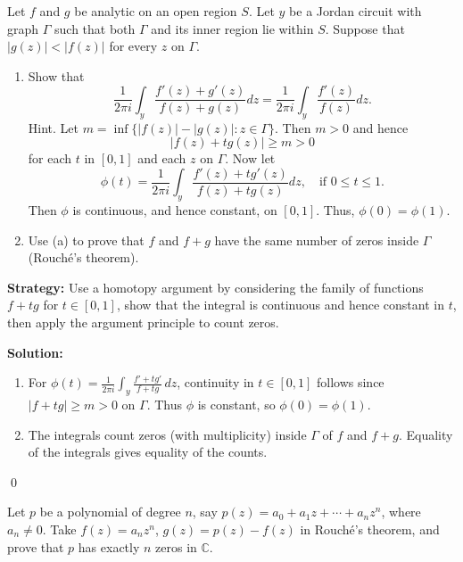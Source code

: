 \begin{problembox}
Let \( f \) and \( g \) be analytic on an open region \( S \). Let \( y \) be a Jordan circuit with graph \( \Gamma \) such that both \( \Gamma \) and its inner region lie within \( S \). Suppose that \( |g(z)| < |f(z)| \) for every \( z \) on \( \Gamma \).
\begin{enumerate}[label=(\alph*)]
\item Show that
\[ \frac{1}{2\pi i} \int_{y} \frac{f'(z) + g'(z)}{f(z) + g(z)} dz = \frac{1}{2\pi i} \int_{y} \frac{f'(z)}{f(z)} dz. \]
Hint. Let \( m = \inf \{ |f(z)| - |g(z)| : z \in \Gamma \} \). Then \( m > 0 \) and hence
\[ |f(z) + t g(z)| \geq m > 0 \]
for each \( t \) in \( [0, 1] \) and each \( z \) on \( \Gamma \). Now let
\[ \phi(t) = \frac{1}{2\pi i} \int_{y} \frac{f'(z) + t g'(z)}{f(z) + t g(z)} dz, \quad \text{if } 0 \leq t \leq 1. \]
Then \( \phi \) is continuous, and hence constant, on \( [0, 1] \). Thus, \( \phi(0) = \phi(1) \).
\item Use (a) to prove that \( f \) and \( f + g \) have the same number of zeros inside \(\Gamma\) (Rouché's theorem).
\end{enumerate}
\end{problembox}

\noindent\textbf{Strategy:} Use a homotopy argument by considering the family of functions \( f + t g \) for \( t \in [0,1] \), show that the integral is continuous and hence constant in \( t \), then apply the argument principle to count zeros.

\bigskip\noindent\textbf{Solution:}
\begin{enumerate}[label=(\alph*)]
\item For $\phi(t)=\frac{1}{2\pi i}\int_{y}\frac{f'+t g'}{f+tg}\,dz$, continuity in $t\in[0,1]$ follows since $|f+tg|\ge m>0$ on $\Gamma$. Thus $\phi$ is constant, so $\phi(0)=\phi(1)$.
\item The integrals count zeros (with multiplicity) inside $\Gamma$ of $f$ and $f+g$. Equality of the integrals gives equality of the counts.
\end{enumerate}\qed


\begin{problembox}
Let \( p \) be a polynomial of degree \( n \), say \( p(z) = a_0 + a_1 z + \cdots + a_n z^n \), where \( a_n \neq 0 \). Take \( f(z) = a_n z^n \), \( g(z) = p(z) - f(z) \) in Rouché's theorem, and prove that \( p \) has exactly \( n \) zeros in \( \mathbb{C} \).
\end{problembox}

